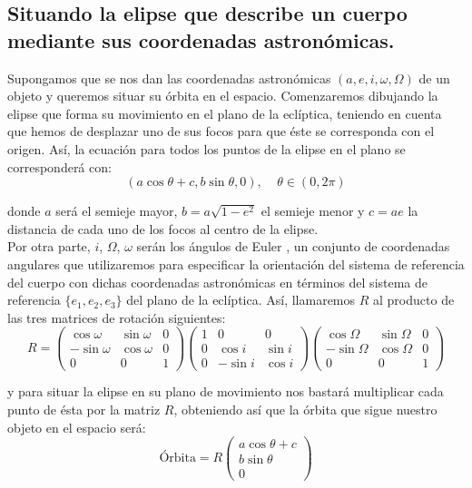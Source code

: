 \subsection{Situando la elipse que describe un cuerpo mediante sus coordenadas astronómicas.}
\label{subsec:set_ellipse_position}
Supongamos que se nos dan las coordenadas astronómicas $(a,e,i,\omega,\Omega)$ de un objeto y queremos situar su órbita en el espacio. Comenzaremos dibujando la elipse que forma su movimiento en el plano de la eclíptica, teniendo en cuenta que hemos de desplazar uno de sus focos para que éste se corresponda con el origen. Así, la ecuación para todos los puntos de la elipse en el plano se corresponderá con:
\[
(a\cos{\theta}+c, b\sin{\theta}, 0), \; \; \; \; \theta\in(0,2\pi)
\]

\noindent donde $a$ será el semieje mayor, $b=a\sqrt{1-e^2}$ el semieje menor y $c=ae$ la distancia de cada uno de los focos al centro de la elipse.\\

Por otra parte, $i$, $\Omega$, $\omega$ serán los ángulos de Euler \cite{euler_angles}, un conjunto de coordenadas angulares que utilizaremos para especificar la orientación del sistema de referencia del cuerpo con dichas coordenadas astronómicas en términos del sistema de referencia $\{e_1,e_2,e_3\}$ del plano de la eclíptica. Así, llamaremos $R$ al producto de las tres matrices de rotación siguientes:
\[
R=
\left(
\begin{array}{ccc}
	\cos{\omega} & \sin{\omega} & 0 \\
	-\sin{\omega} & \cos{\omega} & 0 \\
	0 & 0 & 1
\end{array}
\right)
\left(
\begin{array}{ccc}
	1 & 0 & 0 \\
	0 & \cos{i} & \sin{i} \\
	0 & -\sin{i} & \cos{i}
\end{array}
\right)
\left(
\begin{array}{ccc}
	\cos{\Omega} & \sin{\Omega} & 0 \\
	-\sin{\Omega} & \cos{\Omega} & 0 \\
	0 & 0 & 1
\end{array}
\right)
\]

\noindent y para situar la elipse en su plano de movimiento nos bastará multiplicar cada punto de ésta por la matriz $R$, obteniendo así que la órbita que sigue nuestro objeto en el espacio será:
\[
\text{Órbita}=R
\left(
\begin{array}{c}
a\cos{\theta}+c \\ b\sin{\theta} \\ 0
\end{array}
\right)
\]


